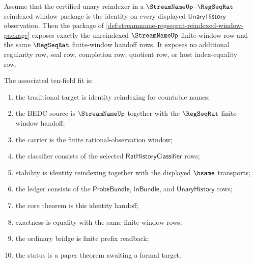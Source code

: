 \begin{theorem}
\label{thm:streamname-regseqrat-reindexed-window-identity-handoff}
Assume that the certified unary reindexer in a
$\StreamNameUp$--$\RegSeqRat$ reindexed window package is the identity on every
displayed $\mathsf{UnaryHistory}$ observation. Then the package of
\autoref{def:streamname-regseqrat-reindexed-window-package} exposes exactly the
unreindexed $\StreamNameUp$ finite-window row and the same $\RegSeqRat$
finite-window handoff rows. It exposes no additional regularity row, seal row,
completion row, quotient row, or host index-equality row.

The associated ten-field fit is:
\begin{enumerate}
\item the traditional target is identity reindexing for countable names;
\item the BEDC source is $\StreamNameUp$ together with the $\RegSeqRat$
finite-window handoff;
\item the carrier is the finite rational-observation window;
\item the classifier consists of the selected $\mathsf{RatHistoryClassifier}$
rows;
\item stability is identity reindexing together with the displayed $\hsame$
transports;
\item the ledger consists of the $\mathsf{ProbeBundle}$,
$\mathsf{InBundle}$, and $\mathsf{UnaryHistory}$ rows;
\item the core theorem is this identity handoff;
\item exactness is equality with the same finite-window rows;
\item the ordinary bridge is finite prefix readback;
\item the status is a paper theorem awaiting a formal target.
\end{enumerate}
\end{theorem}
